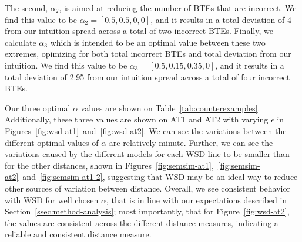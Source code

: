 The second, $\alpha_2$, is aimed at reducing the number of BTEs that are incorrect. We find this value to be $\alpha_2=[0.5,0.5,0,0]$, and it results in a total deviation of 4 from our intuition spread across a total of two incorrect BTEs. Finally, we calculate $\alpha_3$ which is intended to be an optimal value between these two extremes, opimizing for both total incorrect BTEs and total deviation from our intuition. We find this value to be $\alpha_3=[0.5, 0.15, 0.35, 0]$, and it results in a total deviation of 2.95 from our intuition spread across a total of four incorrect BTEs.

Our three optimal $\alpha$ values are shown on Table~\ref{tab:counterexamples}. Additionally, these three values are shown on AT1 and AT2 with varying $\epsilon$ in Figures~\ref{fig:wsd-at1}~and~\ref{fig:wsd-at2}. We can see the variations between the different optimal values of $\alpha$ are relatively minute. Further, we can see the variations caused by the different models for each WSD line to be smaller than for the other distances, shown in Figures~\ref{fig:semsim-at1},~\ref{fig:semsim-at2}~and~\ref{fig:semsim-at1-2}, suggesting that WSD may be an ideal way to reduce other sources of variation between distance. Overall, we see consistent behavior with WSD for well chosen $\alpha$, that is in line with our expectations described in Section~\ref{ssec:method-analysis}; most importantly, that for Figure~\ref{fig:wsd-at2}, the values are consistent across the different distance measures, indicating a reliable and consistent distance measure.














